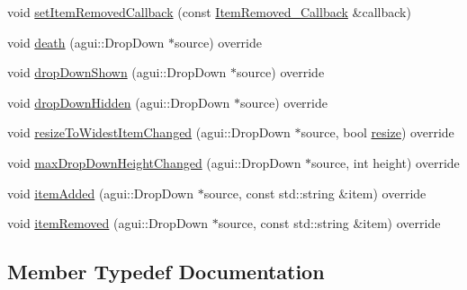 \begin{DoxyCompactItemize}
void \mbox{\hyperlink{classec_1_1_generic_drop_down_listener_ad326f7205b7fc547b17f777500025b8e}{set\+Item\+Removed\+Callback}} (const \mbox{\hyperlink{classec_1_1_generic_drop_down_listener_ad1513561f8a3a3614e207797df83e730}{Item\+Removed\+\_\+\+Callback}} \&callback)
\item 
void \mbox{\hyperlink{classec_1_1_generic_drop_down_listener_a3d36f29d51150dac52d796af2da6b6e9}{death}} (agui\+::\+Drop\+Down $\ast$source) override
\item 
void \mbox{\hyperlink{classec_1_1_generic_drop_down_listener_a23e0a88ebbf1a012d9e2c7619785cde8}{drop\+Down\+Shown}} (agui\+::\+Drop\+Down $\ast$source) override
\item 
void \mbox{\hyperlink{classec_1_1_generic_drop_down_listener_ab482ffbd92369ad620fa570ac8bd69a3}{drop\+Down\+Hidden}} (agui\+::\+Drop\+Down $\ast$source) override
\item 
void \mbox{\hyperlink{classec_1_1_generic_drop_down_listener_aad542fa958815248290047ca0b8eff08}{resize\+To\+Widest\+Item\+Changed}} (agui\+::\+Drop\+Down $\ast$source, bool \mbox{\hyperlink{namespaceec_a84e452d7f020435b50e2c18e7cdca968}{resize}}) override
\item 
void \mbox{\hyperlink{classec_1_1_generic_drop_down_listener_abed6078e4b6c0412d790bb4c782e99f7}{max\+Drop\+Down\+Height\+Changed}} (agui\+::\+Drop\+Down $\ast$source, int height) override
\item 
void \mbox{\hyperlink{classec_1_1_generic_drop_down_listener_a33748da34ef4c229a31cafc4c3cb8c79}{item\+Added}} (agui\+::\+Drop\+Down $\ast$source, const std\+::string \&item) override
\item 
void \mbox{\hyperlink{classec_1_1_generic_drop_down_listener_a492a498a0c2624b2f96beb01ce18e837}{item\+Removed}} (agui\+::\+Drop\+Down $\ast$source, const std\+::string \&item) override
\end{DoxyCompactItemize}


\subsection{Member Typedef Documentation}
\mbox{\label{classec_1_1_generic_drop_down_listener_a72a84eeb2fdcc0eae78b78c53a59db3b}} 
